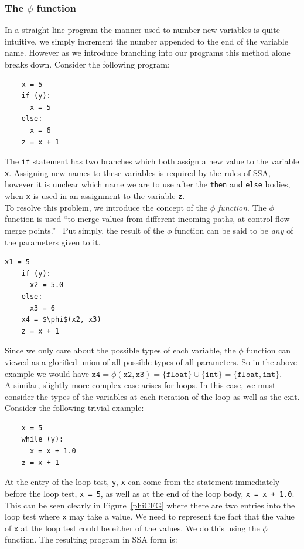 \documentclass[12pt, titlepage]{article}
\begin{document}
\subsubsection{The $\phi$ function}
In a straight line program the manner used to number new variables is quite intuitive, we simply increment the number appended to the end of the variable name. However as we introduce branching into our programs this method alone breaks down. Consider the following program:
\begin{lstlisting}
    x = 5
    if (y):
      x = 5
    else:
      x = 6
    z = x + 1
\end{lstlisting}
The \texttt{if} statement has two branches which both assign a new value to the variable \texttt{x}. Assigning new names to these variables is required by the rules of SSA, however it is unclear which name we are to use after the \texttt{then} and \texttt{else} bodies, when \texttt{x} is used in an assignment to the variable \texttt{z}. \\
\indent To resolve this problem, we introduce the concept of the \emph{$\phi$ function}. The $\phi$ function is used ``to merge values from different incoming paths, at control-flow merge points.''~\cite{ssaBook} Put simply, the result of the $\phi$ function can be said to be \emph{any} of the parameters given to it. 
\begin{lstlisting}[mathescape]
    x1 = 5
    if (y):
      x2 = 5.0
    else:
      x3 = 6
    x4 = $\phi$(x2, x3)
    z = x + 1
\end{lstlisting}
Since we only care about the possible types of each variable, the $\phi$ function can viewed as a glorified union of all possible types of all parameters. So in the above example we would have $\mathtt{x4 = \phi(x2, x3) = \{float\} \cup \{int\} = \{float, int\}}$. \\
\indent A similar, slightly more complex case arises for loops. In this case, we must consider the types of the variables at each iteration of the loop as well as the exit. Consider the following trivial example:
\begin{lstlisting}
    x = 5
    while (y):
      x = x + 1.0
    z = x + 1
\end{lstlisting}
At the entry of the loop test, \texttt{y}, \texttt{x} can come from the statement immediately before the loop test, \texttt{x = 5}, as well as at the end of the loop body, \texttt{x = x + 1.0}. This can be seen clearly in Figure~\ref{phiCFG} where there are two entries into the loop test where \texttt{x} may take a value. We need to represent the fact that the value of \texttt{x} at the loop test could be either of the values. We do this using the $\phi$ function. The resulting program in SSA form is:
\end{document}
